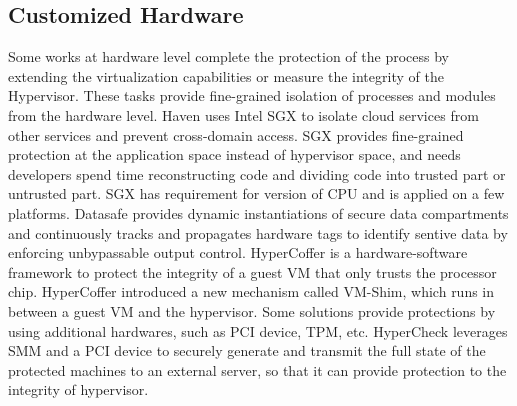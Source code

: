 \subsection{Customized Hardware }
Some works at hardware level complete the protection of the process by extending the virtualization capabilities or measure the integrity of the Hypervisor\cite{Moon2012Vigilare}\cite{Lee2013KI}\cite{azab2010hypersentry}\cite{rutkowska2008preventing}\cite{Wang2010HyperCheck}\cite{zhang2013hypercheck}\cite{azab2011sice}\cite{szefer2012architectural}. These tasks provide fine-grained isolation of processes and modules from the hardware level. Haven \cite{haven} uses Intel SGX\cite{Hoekstra13cuvillo,Mckeen2013Innovative} to isolate cloud services from other services and prevent cross-domain access. SGX provides fine-grained protection at the application space instead of hypervisor space, and needs developers spend time reconstructing code and dividing code into trusted part or untrusted part. SGX has requirement for version of CPU and is applied on a few platforms.
Datasafe\cite{chen2012software} provides dynamic instantiations of secure data compartments and continuously tracks and propagates hardware tags to identify sentive data by enforcing unbypassable output control.
HyperCoffer\cite{xia2013architecture} is a hardware-software framework to protect the integrity of a guest VM that only trusts the processor chip. HyperCoffer introduced a new mechanism called VM-Shim, which runs in between a guest VM and the hypervisor.
Some solutions provide protections by using additional hardwares, such as PCI device, TPM, etc.  HyperCheck\cite{Wang2010HyperCheck} \cite{zhang2013hypercheck} leverages SMM and a PCI device to securely generate and transmit the full state of the protected machines to an external server, so that it can provide protection to the integrity of hypervisor. 

